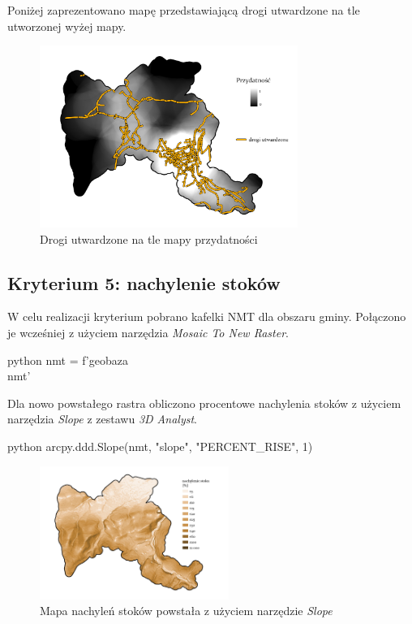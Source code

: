 \documentclass{article}
\begin{document}
Poniżej zaprezentowano mapę przedstawiającą drogi utwardzone na tle utworzonej wyżej mapy.

\begin{figure}[H]
    \centering
    \includegraphics[width=0.75\textwidth]{img/kryterium4-drogi.jpg}
    \caption{Drogi utwardzone na tle mapy przydatności}
\end{figure}
\vspace{10pt}

\subsection{Kryterium 5: nachylenie stoków}
W celu realizacji kryterium pobrano kafelki NMT dla obszaru gminy. Połączono je wcześniej z użyciem narzędzia \textit{Mosaic To New Raster}. 
\vspace{5pt}

\begin{mintedbox}{python}
nmt = f'{geobaza}\\nmt'
\end{mintedbox}
\vspace{10pt}

Dla nowo powstałego rastra obliczono procentowe nachylenia stoków z użyciem narzędzia \textit{Slope} z zestawu \textit{3D Analyst}.
\vspace{5pt}

\begin{mintedbox}{python}
arcpy.ddd.Slope(nmt, "slope", "PERCENT_RISE", 1)
\end{mintedbox}
\vspace{10pt}

\begin{figure}[H]
    \centering
    \includegraphics[width=0.55\textwidth]{img/kryterium5-stoki.jpg}
    \caption{Mapa nachyleń stoków powstała z użyciem narzędzie \textit{Slope}}
\end{figure}
\end{document}
